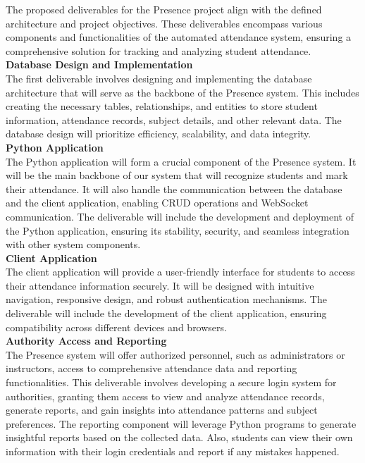 The proposed deliverables for the Presence project align with the defined architecture and project objectives. These deliverables encompass various components and functionalities of the automated attendance system, ensuring a comprehensive solution for tracking and analyzing student attendance.\\

\textbf{Database Design and Implementation}\\
The first deliverable involves designing and implementing the database architecture that will serve as the backbone of the Presence system. This includes creating the necessary tables, relationships, and entities to store student information, attendance records, subject details, and other relevant data. The database design will prioritize efficiency, scalability, and data integrity.\\

\textbf{Python Application}\\
The Python application will form a crucial component of the Presence system. It will be the main backbone of our system that will recognize students and mark their attendance. It will also handle the communication between the database and the client application, enabling CRUD operations and WebSocket communication. The deliverable will include the development and deployment of the Python application, ensuring its stability, security, and seamless integration with other system components.\\

\textbf{Client Application}\\
The client application will provide a user-friendly interface for students to access their attendance information securely. It will be designed with intuitive navigation, responsive design, and robust authentication mechanisms. The deliverable will include the development of the client application, ensuring compatibility across different devices and browsers.\\

\textbf{Authority Access and Reporting}\\
The Presence system will offer authorized personnel, such as administrators or instructors, access to comprehensive attendance data and reporting functionalities. This deliverable involves developing a secure login system for authorities, granting them access to view and analyze attendance records, generate reports, and gain insights into attendance patterns and subject preferences. The reporting component will leverage Python programs to generate insightful reports based on the collected data. Also, students can view their own information with their login credentials and report if any mistakes happened.